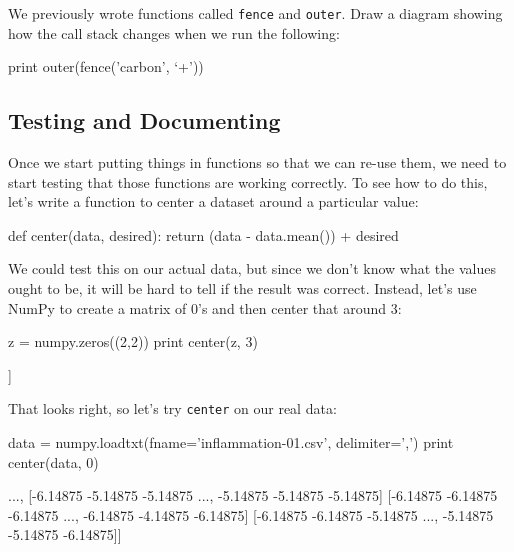 \begin{challenge}
  We previously wrote functions called \texttt{fence} and
  \texttt{outer}. Draw a diagram showing how the call stack changes when
  we run the following:
\begin{VerbIn}
print outer(fence('carbon', `+'))
\end{VerbIn}
\end{challenge}

\subsection{Testing and Documenting}

Once we start putting things in functions so that we can re-use them, we
need to start testing that those functions are working correctly. To see
how to do this, let's write a function to center a dataset around a
particular value:

\begin{VerbIn}
def center(data, desired):
    return (data - data.mean()) + desired
\end{VerbIn}

We could test this on our actual data, but since we don't know what the
values ought to be, it will be hard to tell if the result was correct.
Instead, let's use NumPy to create a matrix of 0's and then center that
around 3:

\begin{VerbIn}
z = numpy.zeros((2,2))
print center(z, 3)
\end{VerbIn}

\begin{VerbOut}
[[ 3.  3.]
 [ 3.  3.]]
\end{VerbOut}

That looks right, so let's try \texttt{center} on our real data:

\begin{VerbIn}
data = numpy.loadtxt(fname='inflammation-01.csv', delimiter=',')
print center(data, 0)
\end{VerbIn}

\begin{VerbOut}
[[-6.14875 -6.14875 -5.14875 ..., -3.14875 -6.14875 -6.14875]
 [-6.14875 -5.14875 -4.14875 ..., -5.14875 -6.14875 -5.14875]
 [-6.14875 -5.14875 -5.14875 ..., -4.14875 -5.14875 -5.14875]
 ...,
 [-6.14875 -5.14875 -5.14875 ..., -5.14875 -5.14875 -5.14875]
 [-6.14875 -6.14875 -6.14875 ..., -6.14875 -4.14875 -6.14875]
 [-6.14875 -6.14875 -5.14875 ..., -5.14875 -5.14875 -6.14875]]
\end{VerbOut}

